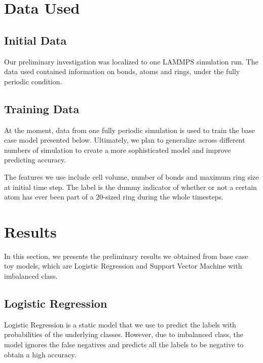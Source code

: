 \section{Data Used}
\subsection{Initial Data}

Our preliminary investigation was localized to one LAMMPS simulation run. The data used contained information on bonds, atoms and rings, under the fully periodic condition.

\subsection{Training Data}
At the moment, data from one fully periodic simulation is used to train the base case model presented below.  Ultimately, we plan to generalize across different numbers of simulation to create a more sophisticated model and improve predicting accuracy. 

The features we use include cell volume, number of bonds and maximum ring size at initial time step. The label is the dummy indicator of whether or not a certain atom has ever been part of a 20-sized ring during the whole timesteps.


\section{Results}
In this section, we presents the preliminary results we obtained from base case toy models, which are Logistic Regression and Support Vector Machine with imbalanced class.

\subsection{Logistic Regression}
Logistic Regression is a static model that we use to predict the labels with probabilities of the underlying classes. However, due to imbalanced class, the model ignores the false negatives and predicts all the labels to be negative to obtain a high accuracy. 

